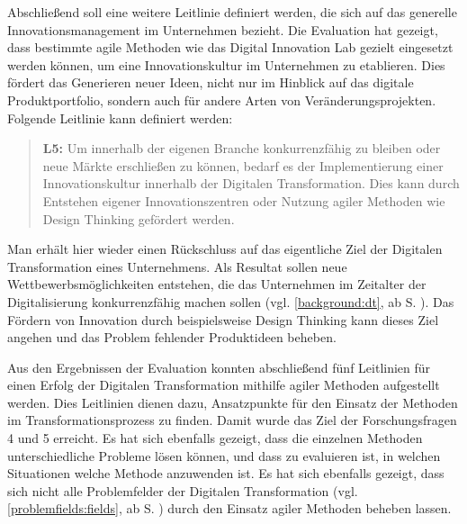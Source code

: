 Abschließend soll eine weitere Leitlinie definiert werden, die sich auf  das generelle Innovationsmanagement im Unternehmen bezieht. Die Evaluation hat gezeigt, dass bestimmte agile Methoden wie das Digital Innovation Lab gezielt eingesetzt werden können, um eine Innovationskultur im Unternehmen zu etablieren. Dies fördert das Generieren neuer Ideen, nicht nur im Hinblick auf das digitale Produktportfolio,  sondern auch für andere Arten von Veränderungsprojekten. Folgende Leitlinie kann definiert werden:

\begin{quote}
	\textbf{L5:} Um innerhalb der eigenen Branche konkurrenzfähig zu bleiben oder neue Märkte erschließen zu können, bedarf es der Implementierung einer Innovationskultur innerhalb der Digitalen Transformation. Dies kann durch Entstehen eigener Innovationszentren oder Nutzung agiler Methoden wie Design Thinking gefördert werden.
\end{quote}

Man erhält hier wieder einen Rückschluss auf das eigentliche Ziel der Digitalen Transformation eines Unternehmens. Als Resultat sollen neue Wettbewerbsmöglichkeiten entstehen, die das Unternehmen im Zeitalter der Digitalisierung konkurrenzfähig machen sollen (vgl. \ref{background:dt}, ab S. \pageref{background:dt}). Das Fördern von Innovation durch beispielsweise Design Thinking kann dieses Ziel angehen und das Problem fehlender Produktideen beheben.

Aus den Ergebnissen der Evaluation konnten abschließend fünf Leitlinien für einen Erfolg der Digitalen Transformation mithilfe agiler Methoden aufgestellt werden. Dies Leitlinien dienen dazu, Ansatzpunkte für den Einsatz der Methoden im Transformationsprozess zu finden. Damit wurde das Ziel der Forschungsfragen 4 und 5 erreicht. Es hat sich ebenfalls gezeigt, dass die einzelnen Methoden unterschiedliche Probleme lösen können, und dass zu evaluieren ist, in welchen Situationen welche Methode anzuwenden ist. Es hat sich ebenfalls gezeigt, dass sich nicht alle Problemfelder der Digitalen Transformation (vgl. \ref{problemfields:fields}, ab S. \pageref{problemfields:fields}) durch den Einsatz agiler Methoden beheben lassen.



